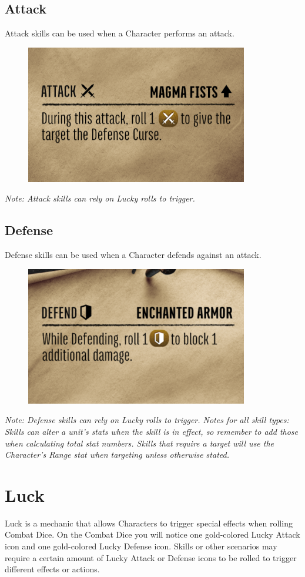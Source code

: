 \documentclass[../main.tex]{subfiles}
\begin{document}
\subsection{Attack}
Attack skills can be used when a Character performs an attack. 
\begin{figure}[h]
    \centering
    \includegraphics[width=0.75\linewidth]{chapters//Skills/TimeStrikeAttackGraphic.png}
\end{figure}

\textit{Note: Attack skills can rely on Lucky rolls to trigger.}

\subsection{Defense}
Defense skills can be used when a Character defends against an attack.

\begin{figure}[h]
    \centering
    \includegraphics[width=0.5\linewidth]{chapters//Skills/TimeStrikeDefenseGraphic.png}
\end{figure}

\textit{Note: Defense skills can rely on Lucky rolls to trigger.  Notes for all skill types: Skills can alter a unit’s stats when the skill is in effect, so remember to add those when calculating total stat numbers. Skills that require a target will use the Character’s Range stat when targeting unless otherwise stated.}

\section{Luck}
Luck is a mechanic that allows Characters to trigger special effects when rolling Combat Dice. On the Combat Dice you will notice one gold-colored Lucky Attack icon and one gold-colored Lucky Defense icon. Skills or other scenarios may require a certain amount of Lucky Attack or Defense icons to be rolled to trigger different effects or actions.
\end{document}
